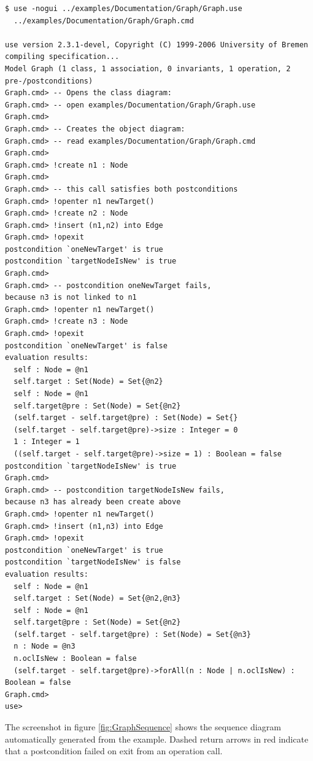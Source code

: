 \documentclass[a4paper,titlepage,oneside,final]{scrreprt} %
\begin{document}
\begin{verbatim}
$ use -nogui ../examples/Documentation/Graph/Graph.use
  ../examples/Documentation/Graph/Graph.cmd

use version 2.3.1-devel, Copyright (C) 1999-2006 University of Bremen
compiling specification...
Model Graph (1 class, 1 association, 0 invariants, 1 operation, 2 pre-/postconditions)
Graph.cmd> -- Opens the class diagram:
Graph.cmd> -- open examples/Documentation/Graph/Graph.use
Graph.cmd>
Graph.cmd> -- Creates the object diagram:
Graph.cmd> -- read examples/Documentation/Graph/Graph.cmd
Graph.cmd>
Graph.cmd> !create n1 : Node
Graph.cmd>
Graph.cmd> -- this call satisfies both postconditions
Graph.cmd> !openter n1 newTarget()
Graph.cmd> !create n2 : Node
Graph.cmd> !insert (n1,n2) into Edge
Graph.cmd> !opexit
postcondition `oneNewTarget' is true
postcondition `targetNodeIsNew' is true
Graph.cmd>
Graph.cmd> -- postcondition oneNewTarget fails,
because n3 is not linked to n1
Graph.cmd> !openter n1 newTarget()
Graph.cmd> !create n3 : Node
Graph.cmd> !opexit
postcondition `oneNewTarget' is false
evaluation results:
  self : Node = @n1
  self.target : Set(Node) = Set{@n2}
  self : Node = @n1
  self.target@pre : Set(Node) = Set{@n2}
  (self.target - self.target@pre) : Set(Node) = Set{}
  (self.target - self.target@pre)->size : Integer = 0
  1 : Integer = 1
  ((self.target - self.target@pre)->size = 1) : Boolean = false
postcondition `targetNodeIsNew' is true
Graph.cmd>
Graph.cmd> -- postcondition targetNodeIsNew fails,
because n3 has already been create above
Graph.cmd> !openter n1 newTarget()
Graph.cmd> !insert (n1,n3) into Edge
Graph.cmd> !opexit
postcondition `oneNewTarget' is true
postcondition `targetNodeIsNew' is false
evaluation results:
  self : Node = @n1
  self.target : Set(Node) = Set{@n2,@n3}
  self : Node = @n1
  self.target@pre : Set(Node) = Set{@n2}
  (self.target - self.target@pre) : Set(Node) = Set{@n3}
  n : Node = @n3
  n.oclIsNew : Boolean = false
  (self.target - self.target@pre)->forAll(n : Node | n.oclIsNew) : Boolean = false
Graph.cmd>
use>
\end{verbatim}
The screenshot in figure \ref{fig:GraphSequence} shows the sequence diagram automatically
generated from the example. Dashed return arrows in red
indicate that a postcondition failed on exit from an operation call.
\end{document}
